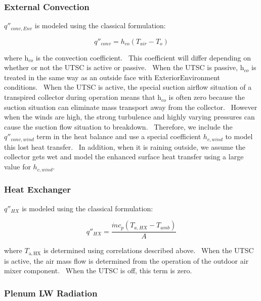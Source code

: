 \subsubsection{External Convection}\label{external-convection-000}

\(q''_{conv,Env}\) is modeled using the classical formulation:

\begin{equation}
{q''_{conv}} = {h_{co}}(T_{air} - T_{o})
\end{equation}

where h\(_{co}\) is the convection coefficient.~ This coefficient will differ depending on whether or not the UTSC is active or passive.~ When the UTSC is passive, h\(_{co}\) is treated in the same way as an outside face with ExteriorEnvironment conditions.~ When the UTSC is active, the special suction airflow situation of a transpired collector during operation means that h\(_{co}\) is often zero because the suction situation can eliminate mass transport away from the collector.~ However when the winds are high, the strong turbulence and highly varying pressures can cause the suction flow situation to breakdown.~ Therefore, we include the \({q''_{conv,wind}}\) term in the heat balance and use a special coefficient \({h_{c,wind}}\) to model this lost heat transfer.~ In addition, when it is raining outside, we assume the collector gets wet and model the enhanced surface heat transfer using a large value for \({h_{c,wind}}\).

\subsubsection{Heat Exchanger}\label{heat-exchanger}

\(q''_{HX}\) is modeled using the classical formulation:

\begin{equation}
{q''_{HX}} = \frac{{\dot m{c_p}({T_{a,HX}} - {T_{amb}})}}{A}
\end{equation}

where \({T_{{\mathrm{a,HX}}}}\) is determined using correlations described above.~ When the UTSC is active, the air mass flow is determined from the operation of the outdoor air mixer component.~ When the UTSC is off, this term is zero.

\subsubsection{Plenum LW Radiation}\label{plenum-lw-radation}

